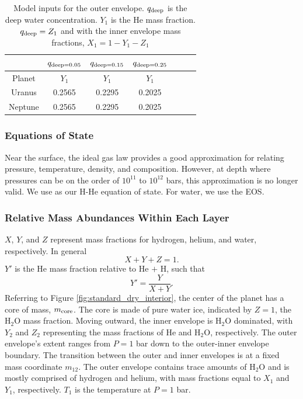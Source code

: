 \documentclass[11pt]{ucscthesisbs}
\begin{document}
\begin{table}[h]
\centering
\begin{tabular}{ccccccc}
                              & $q_{\rm deep = 0.05}$         & $q_{\rm deep = 0.15}$         &  $q_{\rm deep = 0.25}$        \\ \hline
\multicolumn{1}{|c|}{Planet}  &  \multicolumn{1}{c|}{$Y_{1}$} &  \multicolumn{1}{c|}{$Y_{1}$} &  \multicolumn{1}{c|}{$Y_{1}$} \\ \hline
\multicolumn{1}{|c|}{Uranus}  &  \multicolumn{1}{c|}{0.2565}  & \multicolumn{1}{c|}{0.2295}   &  \multicolumn{1}{c|}{0.2025}  \\ \hline
\multicolumn{1}{|c|}{Neptune} &  \multicolumn{1}{c|}{0.2565}  &  \multicolumn{1}{c|}{0.2295}  &  \multicolumn{1}{c|}{0.2025}  \\ \hline
\end{tabular}
\caption{Model inputs for the outer envelope. $q_{\rm deep}$ is the deep water concentration. $Y_{1}$ is the He mass fraction. $q_{\rm deep} = Z_{1}$ and with the inner envelope mass fractions, $X_{1} = 1 - Y_{1} - Z_{1}$ }
\label{tab:outer_envelope_mass_fractions}
\end{table}
\subsubsection{Equations of State}
Near the surface, the ideal gas law provides a good approximation for relating pressure, temperature, density, and composition. However, at depth where pressures can be on the order of $10^{11}$ to $10^{12}$ bars, this approximation is no longer valid. We use \citep{chabrier_eos} as our H-He equation of state. For water, we use the \citep{mazevet_2019} EOS. 

\subsubsection{Relative Mass Abundances Within Each Layer}
$X$, $Y$, and $Z$ represent mass fractions for hydrogen, helium, and water, respectively. In general
\begin{equation}
  X + Y + Z = 1 .
\end{equation}
$Y'$ is the He mass fraction relative to He $+$ H, such that
\begin{equation}
  Y' = \frac{Y}{X+Y}.
\end{equation}
Referring to Figure \ref{fig:standard_dry_interior}, the center of the planet has a core of mass, $m_{\rm core}$. The core is made of pure water ice, indicated by $Z = 1$, the H$_{2}$O mass fraction. Moving outward, the inner envelope is H$_{2}$O dominated, with $Y_{2}$ and $Z_{2}$ representing the mass fractions of He and H$_{2}$O, respectively. The outer envelope's extent ranges from $P=1$ bar down to the outer-inner envelope boundary. The transition between the outer and inner envelopes is at a fixed mass coordinate $m_{12}$. The outer envelope contains trace amounts of H$_{2}$O and is mostly comprised of hydrogen and helium, with mass fractions equal to $X_{1}$ and $Y_{1}$, respectively. $T_{1}$ is the temperature at $P=1$ bar. 
\end{document}
